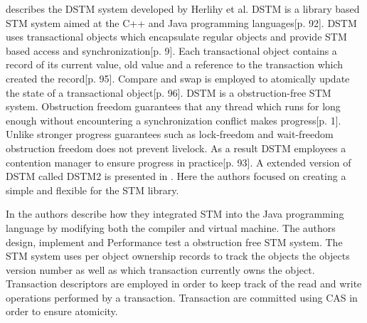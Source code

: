 \cite{herlihy2003software} describes the DSTM system developed by Herlihy et al. DSTM is a library based \ac{STM} system aimed at the C++ and Java programming languages\cite{herlihy2003software}[p. 92]. DSTM uses transactional objects which encapsulate regular objects and provide \ac{STM} based access and synchronization\cite{herlihy2003software}[p. 9]. Each transactional object contains a record of its current value, old value and a reference to the transaction which created the record\cite{herlihy2003software}[p. 95]. Compare and swap is employed to atomically update the state of a transactional object\cite{herlihy2003software}[p. 96]. DSTM is a obstruction-free\cite{herlihy2003obstruction} \ac{STM} system. Obstruction freedom guarantees that any thread which runs for long enough without encountering a synchronization conflict makes progress\cite{herlihy2003obstruction}[p. 1]. Unlike stronger progress guarantees such as lock-freedom and wait-freedom obstruction freedom does not prevent livelock. As a result DSTM employees a contention manager to ensure progress in practice\cite{herlihy2003software}[p. 93]. A extended version of DSTM called DSTM2 is presented in \cite{herlihy2006flexible}. Here the authors focused on creating a simple and flexible  for the \ac{STM} library.

In \cite{harris2003language} the authors describe how they integrated \ac{STM} into the Java programming language by modifying both the compiler\cite[p. 4]{harris2003language} and virtual machine\cite[p. 9]{harris2003language}. The authors design, implement and Performance test a obstruction free \ac{STM} system. The \ac{STM} system uses per object ownership records to track the objects the objects version number as well as which transaction currently owns the object\cite[p. 6]{harris2003language}. Transaction descriptors are employed in order to keep track of the read and write operations performed by a transaction.
Transaction are committed  using \ac{CAS} in order to ensure atomicity\cite[p. 7]{harris2003language}.

